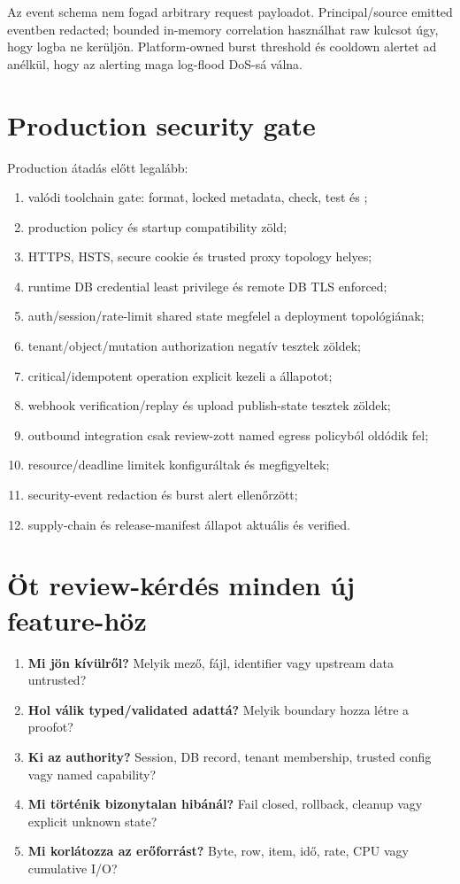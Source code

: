 Az event schema nem fogad arbitrary request payloadot. Principal/source emitted eventben redacted; bounded in-memory correlation használhat raw kulcsot úgy, hogy logba ne kerüljön. Platform-owned burst threshold és cooldown alertet ad anélkül, hogy az alerting maga log-flood DoS-sá válna.

\section{Production security gate}

Production átadás előtt legalább:

\begin{enumerate}
  \item valódi toolchain gate: format, locked metadata, check, test és ;
  \item production policy és startup compatibility zöld;
  \item HTTPS, HSTS, secure cookie és trusted proxy topology helyes;
  \item runtime DB credential least privilege és remote DB TLS enforced;
  \item auth/session/rate-limit shared state megfelel a deployment topológiának;
  \item tenant/object/mutation authorization negatív tesztek zöldek;
  \item critical/idempotent operation explicit kezeli a  állapotot;
  \item webhook verification/replay és upload publish-state tesztek zöldek;
  \item outbound integration csak review-zott named egress policyból oldódik fel;
  \item resource/deadline limitek konfiguráltak és megfigyeltek;
  \item security-event redaction és burst alert ellenőrzött;
  \item supply-chain és release-manifest állapot aktuális és verified.
\end{enumerate}

\section{Öt review-kérdés minden új feature-höz}

\begin{enumerate}
  \item \textbf{Mi jön kívülről?} Melyik mező, fájl, identifier vagy upstream data untrusted?
  \item \textbf{Hol válik typed/validated adattá?} Melyik boundary hozza létre a proofot?
  \item \textbf{Ki az authority?} Session, DB record, tenant membership, trusted config vagy named capability?
  \item \textbf{Mi történik bizonytalan hibánál?} Fail closed, rollback, cleanup vagy explicit unknown state?
  \item \textbf{Mi korlátozza az erőforrást?} Byte, row, item, idő, rate, CPU vagy cumulative I/O?
\end{enumerate}

